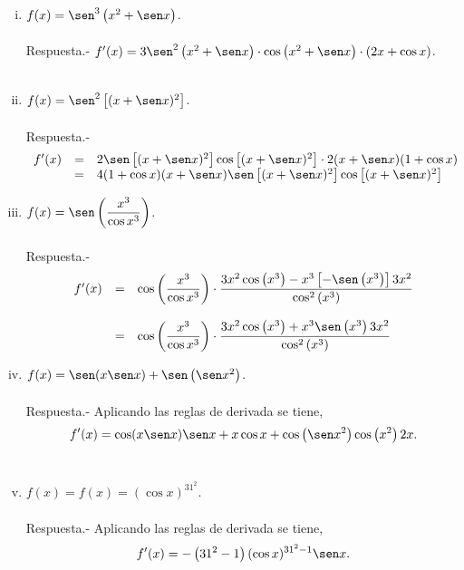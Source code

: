 \begin{enumerate}[\bfseries 1.]
\begin{enumerate}[(i)]
	    \item $f(x)=\sen^3\left(x^2+\sen x\right)$.\\\\
		Respuesta.-\; $f'(x)=3\sen^2\left(x^2+\sen x\right)\cdot \cos\left(x^2+\sen x\right)\cdot (2x+\cos x)$.\\\\


	    \item $f(x)=\sen^2\left[(x+\sen x)^2\right]$.\\\\
		Respuesta.-\; 
		$$\begin{array}{rcl}
		    f'(x)&=&2\sen \left[(x+\sen x)^2 \right] \cos \left[(x+\sen x)^2\right] \cdot 2(x+\sen x)(1+\cos x)\\
			 &=&4(1+\cos x)(x+\sen x)\sen\left[(x+\sen x)^2\right]\cos \left[(x+\sen x)^2\right]\\
		\end{array}$$
		\vspace{0.7cm}

	    \item $f(x)=\sen\left(\dfrac{x^3}{\cos x^3}\right)$.\\\\
		Respuesta.-\; 
		$$\begin{array}{rcl}
		    f'(x)&=&\cos\left(\dfrac{x^3}{\cos x^3}\right)\cdot \dfrac{3x^2\cos\left(x^3\right)-x^3\left[-\sen\left(x^3\right)\right]3x^2}{\cos^2\left(x^3\right)}\\\\
			 &=&\cos\left(\dfrac{x^3}{\cos x^3}\right)\cdot \dfrac{3x^2\cos\left(x^3\right)+x^3\sen\left(x^3\right)3x^2}{\cos^2\left(x^3\right)}
		\end{array}$$
		\vspace{0.7cm}


	    \item $f(x)=\sen(x\sen x)+\sen\left(\sen x^2\right)$.\\\\
		Respuesta.-\; Aplicando las reglas de derivada se tiene,
		$$f'(x)=\cos(x\sen x)\sen x + x\cos x + \cos\left(\sen x^2\right)\cos\left(x^2\right)2x.$$\\

	    \item $f(x)=f(x)=(\cos x)^{31^2}$.\\\\
		Respuesta.-\; Aplicando las reglas de derivada se tiene,
		$$f'(x)=-\left(31^2-1\right)(\cos x)^{31^2-1}\sen x.$$\\


\end{enumerate}
\end{enumerate}
